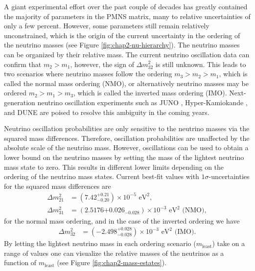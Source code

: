 A giant experimental effort over the past couple of decades has greatly contained the majority of parameters in the PMNS matrix, many to relative uncertainties of only a few percent. However, some parameters still remain relatively unconstrained, which is the origin of the current uncertainty in the ordering of the neutrino masses (see Figure \ref{fig:chap2-nu-hierarchy}). The neutrino masses can be organized by their relative mass. The current neutrino oscillation data can confirm that $m_2>m_1$, however, the sign of $\Delta m_{32}^2$ is still unknown. This leads to two scenarios where neutrino masses follow the ordering $m_3>m_2>m_1$, which is called the normal mass ordering (NMO), or alternatively neutrino masses may be ordered $m_2>m_1>m_3$, which is called the inverted mass ordering (IMO). Next-generation neutrino oscillation experiments such as JUNO \cite{JUNO}, Hyper-Kamiokande \cite{hyperk}, and DUNE \cite{DUNE} are poised to resolve this ambiguity in the coming years.

Neutrino oscillation probabilities are only sensitive to the neutrino masses via the squared mass differences. Therefore, oscillation probabilities are unaffected by the absolute scale of the neutrino mass. However, oscillations can be used to obtain a lower bound on the neutrino masses by setting the mass of the lightest neutrino mass state to zero. This results in different lower limits depending on the ordering of the neutrino mass states. Current best-fit values \cite{pdg2022} with $1\sigma$-uncertainties for the squared mass differences are 
\begin{align}
    \Delta m_{21}^2&=(7.42^{+0.21}_{-0.20})\times 10^{-5}\text{ eV}^2,\\
    \Delta m_{31}^2&=(2.5176{+0.026}_{-0.028})\times 10^{-3}\text{ eV}^2\text{ (NMO)},
\end{align}
for the normal mass ordering, and in the case of the inverted ordering we have
\begin{align}
    \Delta m_{32}^2&=(-2.498^{+0.028}_{-0.028})\times 10^{-3}\text{ eV}^2\text{ (IMO)}.
\end{align}
By letting the lightest neutrino mass in each ordering scenario ($m_\textrm{least}$) take on a range of values one can visualize the relative masses of the neutrinos as a function of $m_\textrm{least}$ (see Figure \ref{fig:chap2-mass-estates}).


